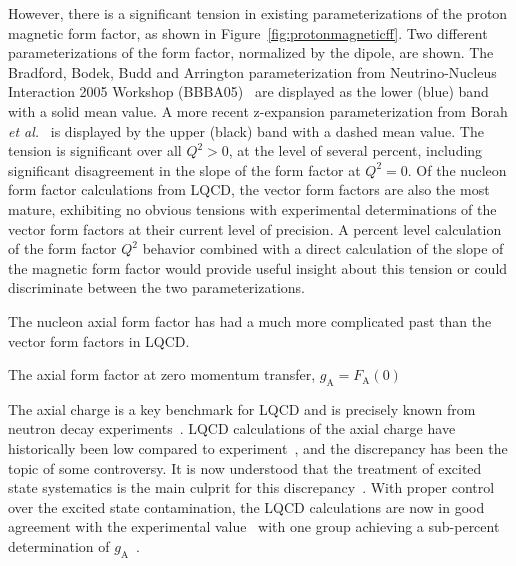 However, there is a significant tension in existing parameterizations of the proton magnetic form factor, as
shown in Figure~\ref{fig:protonmagneticff}.
Two different parameterizations of the form factor, normalized by the dipole, are shown.
The Bradford, Bodek, Budd and Arrington parameterization from Neutrino-Nucleus Interaction 2005 Workshop (BBBA05)~\cite{Bradford:2006yz} are displayed as the lower (blue) band with a solid mean value.
A more recent z-expansion parameterization from Borah {\it et al.}~\cite{Borah:2020gte} is displayed by the upper (black) band with a dashed mean value.
The tension is significant over all $Q^2 > 0$, at the level of several percent,
including significant disagreement in the slope of the form factor at $Q^2 = 0$.
Of the nucleon form factor calculations from LQCD,
the vector form factors are also the most mature,
exhibiting no obvious tensions with experimental determinations
of the vector form factors at their current level of precision.
A percent level calculation of the form factor $Q^2$ behavior combined with a direct calculation of the slope of the magnetic form factor would provide useful insight about this tension or could discriminate
between the two parameterizations.

The nucleon axial form factor has had a much more complicated past than the vector form factors in LQCD.%
\begin{marginnote}
  {The axial form factor at zero momentum transfer, $g_{\mathrm{A}} = F_{\mathrm{A}}(0)$}
\end{marginnote}%
The axial charge is a key benchmark for LQCD and is precisely known
from neutron decay experiments~\cite{Dubbers:2021wqv}.
LQCD calculations of the axial charge have historically been low compared to experiment~\cite{Aoki:2021kgd},
 and the discrepancy has been the topic of some controversy.
It is now understood that the treatment of excited state systematics is the main culprit for this discrepancy~\cite{Bar:2017kxh,Ottnad:2020qbw,Aoki:2021kgd}.
With proper control over the excited state contamination, the LQCD calculations are now in good agreement with the experimental value~\cite{Jang:2019vkm,Gupta:2018qil,Alexandrou:2020okk,Abramczyk:2019fnf,Park:2021ypf,RQCD:2019jai,Hasan:2019noy,Djukanovic:2021yqg,Harris:2019bih,Liang:2018pis,Shintani:2018ozy,Ishikawa:2018rew}
 with one group achieving a sub-percent determination of $g_{\mathrm{A}}$~\cite{Chang:2018uxx,Berkowitz:2018gqe,Walker-Loud:2019cif}.

